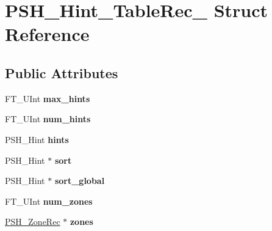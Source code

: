 \hypertarget{struct_p_s_h___hint___table_rec__}{}\section{P\+S\+H\+\_\+\+Hint\+\_\+\+Table\+Rec\+\_\+ Struct Reference}
\label{struct_p_s_h___hint___table_rec__}
\subsection*{Public Attributes}
\begin{DoxyCompactItemize}
\item 
\mbox{\label{struct_p_s_h___hint___table_rec___a09397cc20944d33d6da97560b619c5ba}} 
F\+T\+\_\+\+U\+Int {\bfseries max\+\_\+hints}
\item 
\mbox{\label{struct_p_s_h___hint___table_rec___a31b4cf8054a137eca471b78b3c743ba4}} 
F\+T\+\_\+\+U\+Int {\bfseries num\+\_\+hints}
\item 
\mbox{\label{struct_p_s_h___hint___table_rec___a845075fb5ed4acc6f024892aa00267e0}} 
P\+S\+H\+\_\+\+Hint {\bfseries hints}
\item 
\mbox{\label{struct_p_s_h___hint___table_rec___aa05b021add8a56a12647d117eedce984}} 
P\+S\+H\+\_\+\+Hint $\ast$ {\bfseries sort}
\item 
\mbox{\label{struct_p_s_h___hint___table_rec___a2420ec7ac759f5463693c3022307ec36}} 
P\+S\+H\+\_\+\+Hint $\ast$ {\bfseries sort\+\_\+global}
\item 
\mbox{\label{struct_p_s_h___hint___table_rec___ae37a665a5533bc85e59d38ad1686039c}} 
F\+T\+\_\+\+U\+Int {\bfseries num\+\_\+zones}
\item 
\mbox{\label{struct_p_s_h___hint___table_rec___a4afc59850494c41579c3251ba215e0f2}} 
\hyperlink{struct_p_s_h___zone_rec__}{P\+S\+H\+\_\+\+Zone\+Rec} $\ast$ {\bfseries zones}
\item 
\mbox{\label{struct_p_s_h___hint___table_rec___afed30407dd9e8da52d1c111987b342a9}} 

\end{DoxyCompactItemize}
